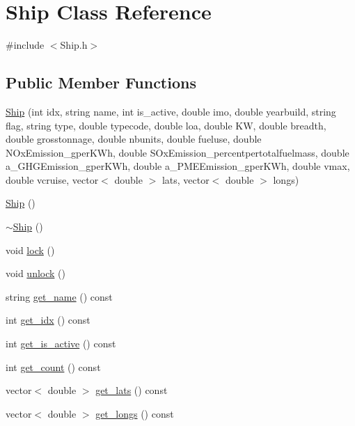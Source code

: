 \hypertarget{class_ship}{}\section{Ship Class Reference}
\label{class_ship}


{\ttfamily \#include $<$Ship.\+h$>$}

\subsection*{Public Member Functions}
\begin{DoxyCompactItemize}
\item 
\mbox{\hyperlink{class_ship_ac888d178c7dee8201424a36bc2c13e20}{Ship}} (int idx, string name, int is\+\_\+active, double imo, double yearbuild, string flag, string type, double typecode, double loa, double KW, double breadth, double grosstonnage, double nbunits, double fueluse, double N\+Ox\+Emission\+\_\+gper\+K\+Wh, double S\+Ox\+Emission\+\_\+percentpertotalfuelmass, double a\+\_\+\+G\+H\+G\+Emission\+\_\+gper\+K\+Wh, double a\+\_\+\+P\+M\+E\+Emission\+\_\+gper\+K\+Wh, double vmax, double vcruise, vector$<$ double $>$ lats, vector$<$ double $>$ longs)
\item 
\mbox{\hyperlink{class_ship_ab7608fcfc4d27c678aacaf9bfd68a462}{Ship}} ()
\item 
\mbox{\hyperlink{class_ship_a43cd6eeaffc11b49239b091621963a65}{$\sim$\+Ship}} ()
\item 
void \mbox{\hyperlink{class_ship_a21d38a209adf9d1828fbefb85b4ecf1d}{lock}} ()
\item 
void \mbox{\hyperlink{class_ship_af47301f512437a323b5750684e5df992}{unlock}} ()
\item 
string \mbox{\hyperlink{class_ship_a748ddbd6c38b534c9aeb16c53dc4fdc3}{get\+\_\+name}} () const
\item 
int \mbox{\hyperlink{class_ship_a2bb4533c2d9ccd6c92668ff3d7132f43}{get\+\_\+idx}} () const
\item 
int \mbox{\hyperlink{class_ship_a363fe0b03679729aed983b12c55ac68b}{get\+\_\+is\+\_\+active}} () const
\item 
int \mbox{\hyperlink{class_ship_aa0706edc7c2ab74ec335088d5fb89337}{get\+\_\+count}} () const
\item 
vector$<$ double $>$ \mbox{\hyperlink{class_ship_a9ea443d338a4eef825f745bc5a4f8096}{get\+\_\+lats}} () const
\item 
vector$<$ double $>$ \mbox{\hyperlink{class_ship_a84638f50c84bfbb6b07bd73d028e97fe}{get\+\_\+longs}} () const

\end{DoxyCompactItemize}
